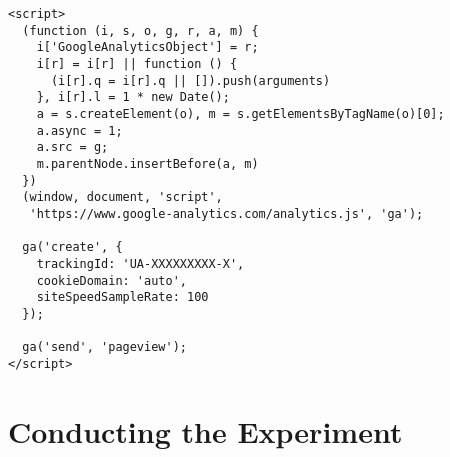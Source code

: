 



\begin{center}
\begin{lstlisting}[caption={The Google Analyitcs Tracking Script}, label={listing:ga_script}, numbers=none]
<script>
  (function (i, s, o, g, r, a, m) {
    i['GoogleAnalyticsObject'] = r;
    i[r] = i[r] || function () {
      (i[r].q = i[r].q || []).push(arguments)
    }, i[r].l = 1 * new Date();
    a = s.createElement(o), m = s.getElementsByTagName(o)[0];
    a.async = 1;
    a.src = g;
    m.parentNode.insertBefore(a, m)
  })
  (window, document, 'script',
   'https://www.google-analytics.com/analytics.js', 'ga');

  ga('create', {
    trackingId: 'UA-XXXXXXXXX-X',
    cookieDomain: 'auto',
    siteSpeedSampleRate: 100
  });
  
  ga('send', 'pageview');
</script>
\end{lstlisting}
\end{center}






\section{Conducting the Experiment}







